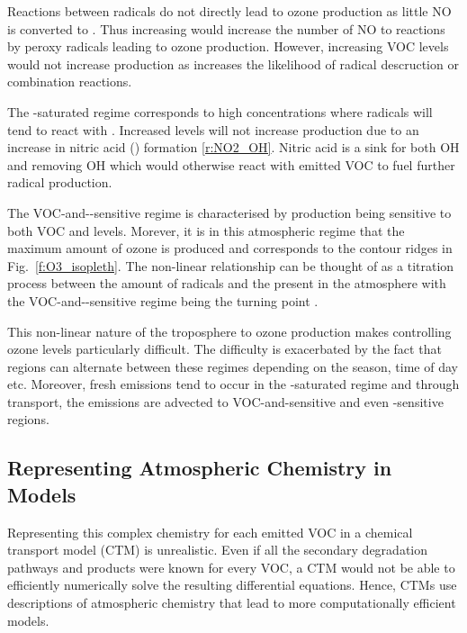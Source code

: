 Reactions between radicals do not directly lead to ozone production as little NO is converted to .
Thus increasing  would increase the number of NO to  reactions by peroxy radicals leading to ozone production.
However, increasing VOC levels would not increase  production as increases the likelihood of radical descruction or combination reactions.

The -saturated regime corresponds to high  concentrations where radicals will tend to react with . 
Increased  levels will not increase  production due to an increase in nitric acid () formation \eqref{r:NO2_OH}.
Nitric acid is a sink for both OH and  removing OH which would otherwise react with emitted VOC to fuel further radical production.
\begin{rxnarray}
     \rightarrow {} \label{r:NO2_OH}
\end{rxnarray}

The VOC-and--sensitive regime is characterised by  production being sensitive to both VOC and  levels. 
Morever, it is in this atmospheric regime that the maximum amount of ozone is produced and corresponds to the contour ridges in Fig.~\ref{f:O3_isopleth}.
The non-linear relationship can be thought of as a titration process between the amount of radicals and the  present in the atmosphere with the VOC-and--sensitive regime being the turning point \citep{Kleinman:1991, Kleinman:1994}.

This non-linear nature of the troposphere to ozone production makes controlling ozone levels particularly difficult.
The difficulty is exacerbated by the fact that regions can alternate between these regimes depending on the season, time of day etc.
Moreover, fresh emissions tend to occur in the -saturated regime and through transport, the emissions are advected to VOC-and-sensitive and even -sensitive regions.

\subsection{Representing Atmospheric Chemistry in Models} \label{ss:chemistry_models}
Representing this complex chemistry for each emitted VOC in a chemical transport model (CTM) is unrealistic.
Even if all the secondary degradation pathways and products were known for every VOC, a CTM would not be able to efficiently numerically solve the resulting differential equations.
Hence, CTMs use descriptions of atmospheric chemistry that lead to more computationally efficient models.

